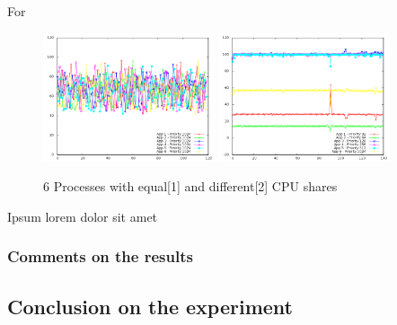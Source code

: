 For 

\begin{figure}[h!]
\begin{center}
	\includegraphics[width=0.45\textwidth]{./Images/CpuMonitor/vm/6_equalshares.png}
	\includegraphics[width=0.45\textwidth]{./Images/CpuMonitor/vm/6_differentshares.png}
	\caption{6 Processes with equal[1] and different[2] CPU shares}
\end{center}
\end{figure}

Ipsum lorem dolor sit amet

\subsubsection{Comments on the results}

\subsection{Conclusion on the experiment}
